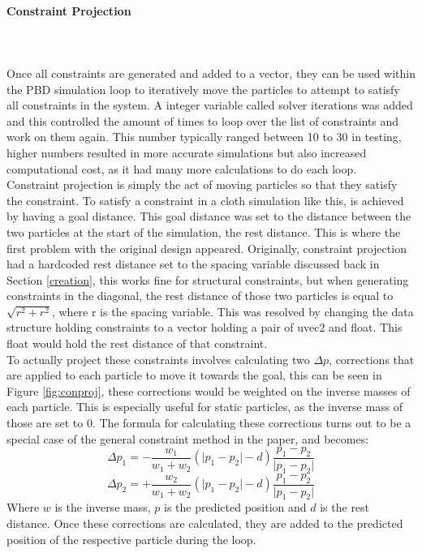 \documentclass[12pt,a4paper]{article}
\begin{document}
\paragraph{Constraint Projection}\mbox{} \\ \\
Once all constraints are generated and added to a vector, they can be used within the PBD simulation loop to iteratively move the particles to attempt to satisfy all constraints in the system. A integer variable called solver iterations was added and this controlled the amount of times to loop over the list of constraints and work on them again. This number typically ranged between 10 to 30 in testing, higher numbers resulted in more accurate simulations but also increased computational cost, as it had many more calculations to do each loop.\\

Constraint projection is simply the act of moving particles so that they satisfy the constraint. To satisfy a constraint in a cloth simulation like this, is achieved by having a goal distance. This goal distance was set to the distance between the two particles at the start of the simulation, the rest distance. This is where the first problem with the original design appeared. Originally, constraint projection had a hardcoded rest distance set to the spacing variable discussed back in Section \ref{creation}, this works fine for structural constraints, but when generating constraints in the diagonal, the rest distance of those two particles is equal to $\sqrt{r^2 + r^2}$, where r is the spacing variable. This was resolved by changing the data structure holding constraints to a vector holding a pair of uvec2 and float. This float would hold the rest distance of that constraint. \\

To actually project these constraints involves calculating two ${\Delta}p$, corrections that are applied to each particle to move it towards the goal, this can be seen in Figure \ref{fig:conproj}, these corrections would be weighted on the inverse masses of each particle. This is especially useful for static particles, as the inverse mass of those are set to 0. The formula for calculating these corrections turns out to be a special case of the general constraint method in the paper, and becomes: 
\[{\Delta}p_1=-\frac{w_1}{w_1+w_2}(\lvert p_1-p_2 \rvert -d)\frac{p_1-p_2}{\lvert p_1-p_2 \rvert}\] 
\[{\Delta}p_2=+\frac{w_2}{w_1+w_2}(\lvert p_1-p_2 \rvert -d)\frac{p_1-p_2}{\lvert p_1-p_2 \rvert}\] 
Where $w$ is the inverse mass, $p$ is the predicted position and $d$ is the rest distance.
Once these corrections are calculated, they are added to the predicted position of the respective particle during the loop. \\
\end{document}

